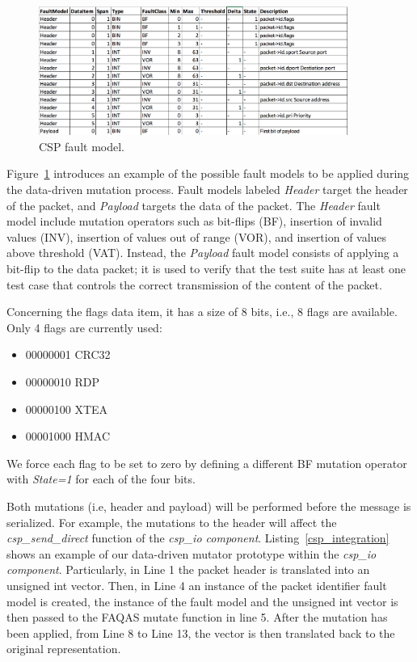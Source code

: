 \begin{figure}[h]
  \centering
    \includegraphics[width=0.9\textwidth]{images/FaultModelCSP_temp}
      \caption{CSP fault model.}
      \label{fig:csp_faultmodel}
\end{figure}

Figure~\ref{fig:csp_faultmodel} introduces an example of the possible fault models to be applied during the data-driven mutation process.
Fault models labeled \emph{Header} target the header of the packet, and \emph{Payload} targets the data of the packet.
The \emph{Header} fault model include mutation operators such as bit-flips (BF), insertion of invalid values (INV), insertion of values out of range (VOR), and insertion of values above threshold (VAT).
Instead, the \emph{Payload} fault model consists of applying a bit-flip to the data packet; it is used to verify that the test suite has at least one test case that controls the correct transmission of the content of the packet.

Concerning the flags data item, it has a size of 8 bits, i.e., 8 flags are available. Only 4 flags are currently used:
\begin{itemize}
\item 00000001              CRC32
\item 00000010             RDP
\item 00000100             XTEA
\item 00001000             HMAC
\end{itemize}
We force each flag to be set to zero by defining a different BF mutation operator with \emph{State=1} for each of the four bits.



Both mutations (i.e, header and payload) will be performed before the message is serialized. 
For example, the mutations to the header will affect the \emph{csp\_send\_direct} function of the \emph{csp\_io component}. 
Listing~\ref{csp_integration} shows an example of our data-driven mutator prototype within the \emph{csp\_io component}. 
Particularly, in Line 1 the packet header is translated into an unsigned int vector. 
Then, in Line 4 an instance of the packet identifier fault model is created, 
the instance of the fault model and the unsigned int vector is then passed to the FAQAS mutate function in line 5.
After the mutation has been applied, from Line 8 to Line 13, the vector is then translated back to the original representation.
 


